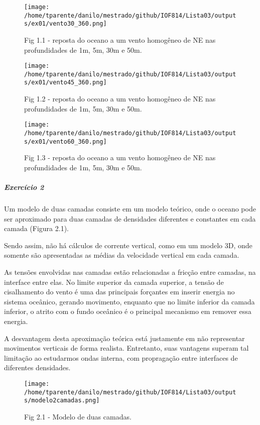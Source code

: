 \documentclass[11pt]{article}
\makeatletter
\def\maxwidth{\ifdim\Gin@nat@width>\linewidth\linewidth
    \else\Gin@nat@width\fi}
\let\Oldincludegraphics\includegraphics
\renewcommand{\includegraphics}[1]{\Oldincludegraphics[width=.8\maxwidth]{#1}}
\makeatother
\begin{document}
\begin{figure}[!ht]
\centering
\centerline{\hbox{\texttt{[image: /home/tparente/danilo/mestrado/github/IOF814/Lista03/outputs/ex01/vento30\_360.png]}}}
\caption{Fig 1.1 - reposta do oceano a um vento homogêneo de NE nas profundidades de 1m, 5m, 30m e 50m.}
\label{fig1:1}
\end{figure}

\begin{figure}[!ht]
\centering
\centerline{\hbox{\texttt{[image: /home/tparente/danilo/mestrado/github/IOF814/Lista03/outputs/ex01/vento45\_360.png]}}}
\caption{Fig 1.2 - reposta do oceano a um vento homogêneo de NE nas profundidades de 1m, 5m, 30m e 50m.}
\label{fig1:2}
\end{figure}

\begin{figure}[!ht]
\centering
\centerline{\hbox{\texttt{[image: /home/tparente/danilo/mestrado/github/IOF814/Lista03/outputs/ex01/vento60\_360.png]}}}
\caption{Fig 1.3 - reposta do oceano a um vento homogêneo de NE nas profundidades de 1m, 5m, 30m e 50m.}
\label{fig1:3}
\end{figure}

\newpage
\newpage
    \subparagraph{Exercício 2}\label{exercuxedcio-2}

Um modelo de duas camadas consiste em um modelo teórico, onde o oceano
pode ser aproximado para duas camadas de densidades diferentes e
constantes em cada camada (Figura 2.1).

Sendo assim, não há cálculos de corrente vertical, como em um modelo 3D,
onde somente são apresentadas as médias da velocidade vertical em cada
camada.

As tensões envolvidas nas camadas estão relacionadas a fricção entre
camadas, na interface entre elas. No limite superior da camada superior,
a tensão de cisalhamento do vento é uma das principais forçantes em
inserir energia no sistema oceânico, gerando movimento, enquanto que no
limite inferior da camada inferior, o atrito com o fundo oceânico é o
principal mecanismo em remover essa energia.

A desvantagem desta aproximação teórica está justamente em não
representar movimentos verticais de forma realista. Entretanto, suas
vantagens superam tal limitação ao estudarmos ondas interna, com
propragação entre interfaces de diferentes densidades.

\begin{figure}[!ht]
\centering
\centerline{\hbox{\texttt{[image: /home/tparente/danilo/mestrado/github/IOF814/Lista03/outputs/modelo2camadas.png]}}}
\caption{Fig 2.1 - Modelo de duas camadas.}
\label{fig2:1}
\end{figure}
\end{document}
